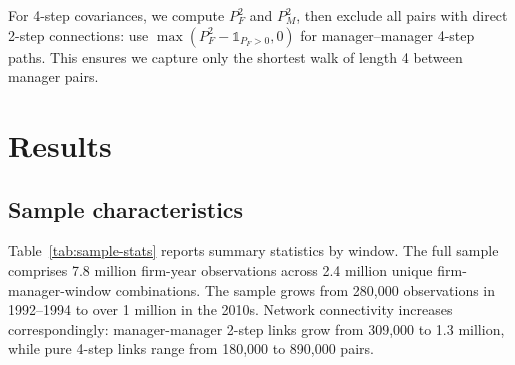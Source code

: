 \documentclass[9pt,twocolumn,twoside]{pnas-new}
\begin{document}
For 4-step covariances, we compute $P_F^2$ and $P_M^2$, then exclude all pairs with direct 2-step connections: use $\max(P_F^2 - \mathbb{1}_{P_F>0}, 0)$ for manager--manager 4-step paths. This ensures we capture only the shortest walk of length 4 between manager pairs.

\section*{Results}

\subsection*{Sample characteristics}
Table~\ref{tab:sample-stats} reports summary statistics by window. The full sample comprises 7.8 million firm-year observations across 2.4 million unique firm-manager-window combinations. The sample grows from 280,000 observations in 1992--1994 to over 1 million in the 2010s. Network connectivity increases correspondingly: manager-manager 2-step links grow from 309,000 to 1.3 million, while pure 4-step links range from 180,000 to 890,000 pairs.
\end{document}
